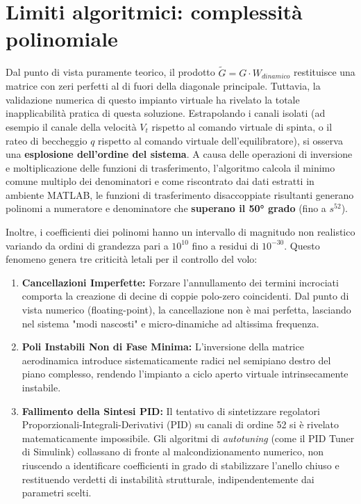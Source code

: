 \section{Limiti algoritmici: complessità polinomiale}
Dal punto di vista puramente teorico, il prodotto $\tilde{G} = G \cdot W_{dinamico}$ restituisce una matrice con zeri perfetti al di fuori della diagonale principale. Tuttavia, la validazione numerica di questo impianto virtuale ha rivelato la totale inapplicabilità pratica di questa soluzione. Estrapolando i canali isolati (ad esempio il canale della velocità $V_t$ rispetto al comando virtuale di spinta, o il rateo di beccheggio $q$ rispetto al comando virtuale dell'equilibratore), si osserva una \textbf{esplosione dell'ordine del sistema}. A causa delle operazioni di inversione e moltiplicazione delle funzioni di trasferimento, l'algoritmo calcola il minimo comune multiplo dei denominatori e come riscontrato dai dati estratti in ambiente MATLAB, le funzioni di trasferimento disaccoppiate risultanti generano polinomi a numeratore e denominatore che \textbf{superano il 50° grado} (fino a $s^{52}$).

Inoltre, i coefficienti diei polinomi hanno un intervallo di magnitudo non realistico variando da ordini di grandezza pari a $10^{10}$ fino a residui di $10^{-30}$. Questo fenomeno genera tre criticità letali per il controllo del volo:
\begin{enumerate}
	\item \textbf{Cancellazioni Imperfette:} Forzare l'annullamento dei termini incrociati comporta la creazione di decine di coppie polo-zero coincidenti. Dal punto di vista numerico (floating-point), la cancellazione non è mai perfetta, lasciando nel sistema "modi nascosti" e micro-dinamiche ad altissima frequenza.
	\item \textbf{Poli Instabili Non di Fase Minima:} L'inversione della matrice aerodinamica introduce sistematicamente radici nel semipiano destro del piano complesso, rendendo l'impianto a ciclo aperto virtuale intrinsecamente instabile.
	\item \textbf{Fallimento della Sintesi PID:} Il tentativo di sintetizzare regolatori Proporzionali-Integrali-Derivativi (PID) su canali di ordine 52 si è rivelato matematicamente impossibile. Gli algoritmi di \textit{autotuning} (come il PID Tuner di Simulink) collassano di fronte al malcondizionamento numerico, non riuscendo a identificare coefficienti in grado di stabilizzare l'anello chiuso e restituendo verdetti di instabilità strutturale, indipendentemente dai parametri scelti.
\end{enumerate}

